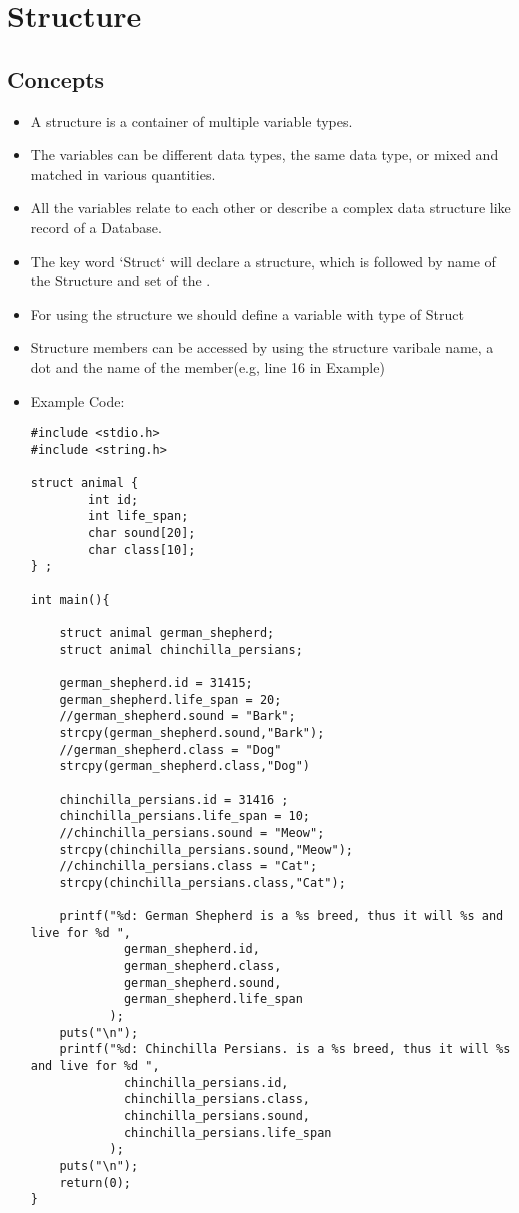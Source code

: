 \section{Structure}
\subsection{Concepts}

\begin{itemize}
    \item A structure is a container of multiple variable types.
    \item The variables can be different data types, the same data type, or mixed and matched in various quantities.
    \item All the variables relate to each other or describe a complex data structure like record of a Database.
    \item The key word `Struct` will declare a structure, which is followed by name of the Structure and set of the {}.
    \item For using the structure we should define a variable with type of Struct
    \item Structure members can be accessed by using the structure varibale name, a dot and the name of the member(e.g, line 16 in Example)        
    \item Example Code:
\begin{lstlisting}
#include <stdio.h>
#include <string.h>

struct animal {
        int id;
        int life_span;
        char sound[20];
        char class[10];
} ;
          
int main(){
          
    struct animal german_shepherd;
    struct animal chinchilla_persians;

    german_shepherd.id = 31415;
    german_shepherd.life_span = 20;
    //german_shepherd.sound = "Bark";
    strcpy(german_shepherd.sound,"Bark");
    //german_shepherd.class = "Dog"
    strcpy(german_shepherd.class,"Dog")

    chinchilla_persians.id = 31416 ;
    chinchilla_persians.life_span = 10;
    //chinchilla_persians.sound = "Meow";
    strcpy(chinchilla_persians.sound,"Meow");
    //chinchilla_persians.class = "Cat";
    strcpy(chinchilla_persians.class,"Cat");

    printf("%d: German Shepherd is a %s breed, thus it will %s and live for %d ",
             german_shepherd.id,
             german_shepherd.class,
             german_shepherd.sound,
             german_shepherd.life_span
           );
    puts("\n");
    printf("%d: Chinchilla Persians. is a %s breed, thus it will %s and live for %d ",
             chinchilla_persians.id,
             chinchilla_persians.class,
             chinchilla_persians.sound,
             chinchilla_persians.life_span
           );
    puts("\n");
    return(0);
}
\end{lstlisting}


\end{itemize}
